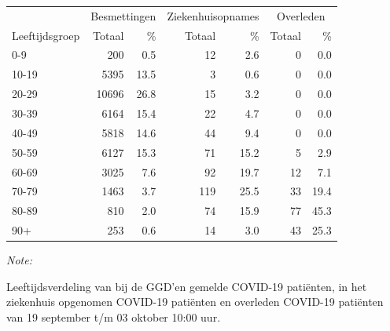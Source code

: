 \documentclass[
  english,
  man,floatsintext]{apa6}
\begin{document}
\begin{table}[H]
\centering\begingroup\fontsize{11}{13}\selectfont

\begin{threeparttable}
\begin{tabular}{lrrrrrr}
\toprule
\multicolumn{1}{c}{ } & \multicolumn{2}{c}{Besmettingen} & \multicolumn{2}{c}{Ziekenhuisopnames} & \multicolumn{2}{c}{Overleden} \\
\cmidrule(l{3pt}r{3pt}){2-3} \cmidrule(l{3pt}r{3pt}){4-5} \cmidrule(l{3pt}r{3pt}){6-7}
Leeftijdsgroep & Totaal & \% & Totaal & \% & Totaal & \%\\
\midrule
0-9 & 200 & 0.5 & 12 & 2.6 & 0 & 0.0\\
10-19 & 5395 & 13.5 & 3 & 0.6 & 0 & 0.0\\
20-29 & 10696 & 26.8 & 15 & 3.2 & 0 & 0.0\\
30-39 & 6164 & 15.4 & 22 & 4.7 & 0 & 0.0\\
40-49 & 5818 & 14.6 & 44 & 9.4 & 0 & 0.0\\
50-59 & 6127 & 15.3 & 71 & 15.2 & 5 & 2.9\\
60-69 & 3025 & 7.6 & 92 & 19.7 & 12 & 7.1\\
70-79 & 1463 & 3.7 & 119 & 25.5 & 33 & 19.4\\
80-89 & 810 & 2.0 & 74 & 15.9 & 77 & 45.3\\
90+ & 253 & 0.6 & 14 & 3.0 & 43 & 25.3\\
\bottomrule
\end{tabular}
\begin{tablenotes}
\item \textit{Note: } 
\item Leeftijdsverdeling van bij de GGD’en gemelde COVID-19 patiënten, in het ziekenhuis opgenomen COVID-19 patiënten en overleden COVID-19 patiënten van 19 september t/m 03 oktober 10:00 uur.
\end{tablenotes}
\end{threeparttable}
\endgroup{}
\end{table}
\end{document}
